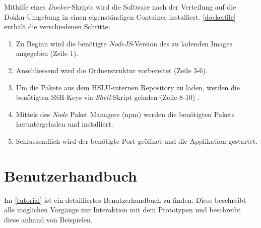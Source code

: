 Mithilfe eines \textit{Docker}-Skripts wird die Software nach der Verteilung auf die \gls{Dokku}-Umgebung in einen eigenständigen Container installiert. \autoref{dockerfile} enthält die verschiedenen Schritte:
\begin{enumerate}
    \item Zu Beginn wird die benötigte \textit{NodeJS}-Version des zu ladenden Images angegeben (Zeile 1).
    \item Anschliessend wird die Ordnerstruktur vorbereitet (Zeile 3-6).
    \item Um die Pakete aus dem HSLU-internen Repository zu laden, werden die benötigten SSH-Keys via \textit{Shell}-Skript geladen (Zeile 8-10) .
    \item Mittels des \textit{Node} Paket Managers (npm) werden die benötigten Pakete heruntergeladen und installiert.
    \item Schlussendlich wird der benötigte Port geöffnet und die Applikation gestartet.
\end{enumerate}
    


\section{Benutzerhandbuch}


Im \autoref{tutorial} ist ein detailliertes Benutzerhandbuch zu finden. Diese beschreibt alle möglichen Vorgänge zur Interaktion mit dem Prototypen und beschreibt diese anhand von Beispielen.
